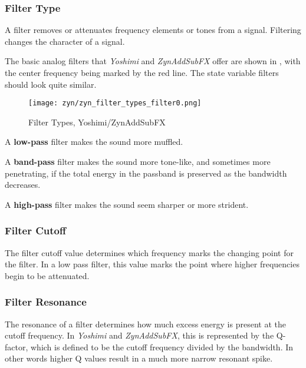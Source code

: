 \subsubsection{Filter Type}
\label{subsubsec:filter_type}

   A filter removes or attenuates frequency elements or tones from a signal.
   Filtering changes the character of a signal.

   The basic analog filters that \textsl{Yoshimi} and \textsl{ZynAddSubFX}
   offer are shown in , with
   the center frequency being marked by the red
   line. The state variable filters should look quite similar.

\begin{figure}[H]          %
   \centering 
   \texttt{[image: zyn/zyn\_filter\_types\_filter0.png]}
   \caption[Basic Filter Types]{Filter Types, Yoshimi/ZynAddSubFX}
   \label{fig:basic_filter_types} 
\end{figure}

   \begin{enumber}
      \item A \textbf{low-pass} filter makes the sound more muffled.
      \item A \textbf{band-pass} filter makes the sound more tone-like, and
         sometimes more penetrating, if the total energy in the passband is
         preserved as the bandwidth decreases.
      \item A \textbf{high-pass} filter makes the sound seem sharper or more
         strident.
   \end{enumber}

\subsubsection{Filter Cutoff}
\label{subsubsec:filter_cutoff}

   The filter cutoff value determines which frequency marks the changing
   point for the filter. In a low pass filter, this value marks the point
   where higher frequencies begin to be attenuated.

\subsubsection{Filter Resonance}
\label{subsubsec:filter_resonance}

   The resonance of a filter determines how much excess energy is present at
   the cutoff frequency. In \textsl{Yoshimi} and \textsl{ZynAddSubFX},
   this is represented by the Q-factor,
   which is defined to be the cutoff frequency divided by the bandwidth. In
   other words higher Q values result in a much more narrow resonant spike.

